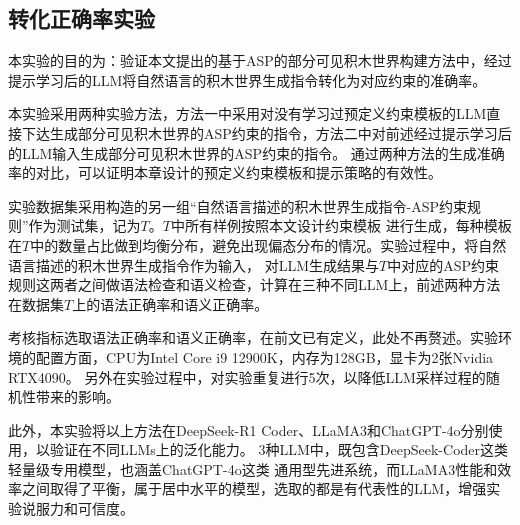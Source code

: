 \subsection{转化正确率实验}
本实验的目的为：验证本文提出的基于ASP的部分可见积木世界构建方法中，经过提示学习后的LLM将自然语言的积木世界生成指令转化为对应约束的准确率。

本实验采用两种实验方法，方法一中采用对没有学习过预定义约束模板的LLM直接下达生成部分可见积木世界的ASP约束的指令，方法二中对前述经过提示学习后的LLM输入生成部分可见积木世界的ASP约束的指令。
通过两种方法的生成准确率的对比，可以证明本章设计的预定义约束模板和提示策略的有效性。

实验数据集采用构造的另一组“自然语言描述的积木世界生成指令-ASP约束规则”作为测试集，记为$T$。$T$中所有样例按照本文设计约束模板
进行生成，每种模板在$T$中的数量占比做到均衡分布，避免出现偏态分布的情况。实验过程中，将自然语言描述的积木世界生成指令作为输入，
对LLM生成结果与$T$中对应的ASP约束规则这两者之间做语法检查和语义检查，计算在三种不同LLM上，前述两种方法在数据集$T$上的语法正确率和语义正确率。

考核指标选取语法正确率和语义正确率，在前文已有定义，此处不再赘述。实验环境的配置方面，CPU为Intel Core i9 12900K，内存为128GB，显卡为2张Nvidia RTX4090。
另外在实验过程中，对实验重复进行5次，以降低LLM采样过程的随机性带来的影响。

此外，本实验将以上方法在DeepSeek-R1 Coder、LLaMA3和ChatGPT-4o分别使用，以验证在不同LLMs上的泛化能力。
3种LLM中，既包含DeepSeek-Coder这类轻量级专用模型，也涵盖ChatGPT-4o这类
通用型先进系统，而LLaMA3性能和效率之间取得了平衡，属于居中水平的模型，选取的都是有代表性的LLM，增强实验说服力和可信度。

